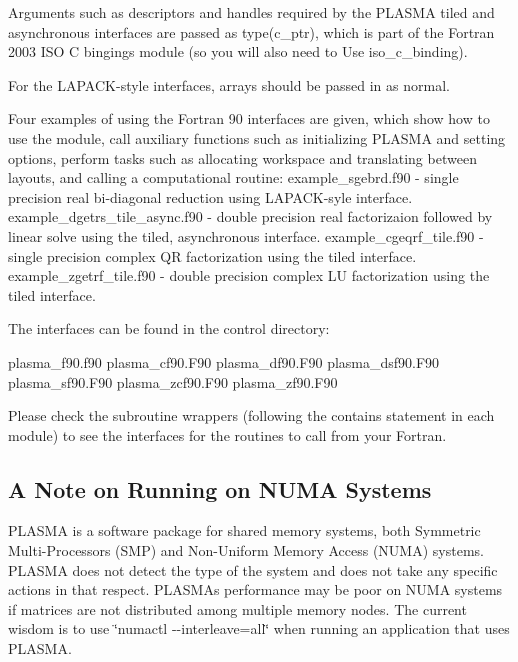 Arguments such as descriptors and handles required by the P\+L\+A\+S\+M\+A tiled and asynchronous interfaces are passed as type(c\+\_\+ptr), which is part of the Fortran 2003 I\+S\+O C bingings module (so you will also need to \textquotesingle{}Use iso\+\_\+c\+\_\+binding\textquotesingle{}).

For the L\+A\+P\+A\+C\+K-\/style interfaces, arrays should be passed in as normal.

Four examples of using the Fortran 90 interfaces are given, which show how to use the module, call auxiliary functions such as initializing P\+L\+A\+S\+M\+A and setting options, perform tasks such as allocating workspace and translating between layouts, and calling a computational routine\+: example\+\_\+sgebrd.\+f90 -\/ single precision real bi-\/diagonal reduction using L\+A\+P\+A\+C\+K-\/syle interface. example\+\_\+dgetrs\+\_\+tile\+\_\+async.\+f90 -\/ double precision real factorizaion followed by linear solve using the tiled, asynchronous interface. example\+\_\+cgeqrf\+\_\+tile.\+f90 -\/ single precision complex Q\+R factorization using the tiled interface. example\+\_\+zgetrf\+\_\+tile.\+f90 -\/ double precision complex L\+U factorization using the tiled interface.

The interfaces can be found in the \textquotesingle{}control\textquotesingle{} directory\+:

plasma\+\_\+f90.\+f90 plasma\+\_\+cf90.\+F90 plasma\+\_\+df90.\+F90 plasma\+\_\+dsf90.\+F90 plasma\+\_\+sf90.\+F90 plasma\+\_\+zcf90.\+F90 plasma\+\_\+zf90.\+F90

Please check the subroutine wrappers (following the \textquotesingle{}contains\textquotesingle{} statement in each module) to see the interfaces for the routines to call from your Fortran.

\subsection*{A Note on Running on N\+U\+M\+A Systems }

P\+L\+A\+S\+M\+A is a software package for shared memory systems, both Symmetric Multi-\/\+Processors (S\+M\+P) and Non-\/\+Uniform Memory Access (N\+U\+M\+A) systems. P\+L\+A\+S\+M\+A does not detect the type of the system and does not take any specific actions in that respect. P\+L\+A\+S\+M\+A\textquotesingle{}s performance may be poor on N\+U\+M\+A systems if matrices are not distributed among multiple memory nodes. The current wisdom is to use \char`\"{}numactl -\/-\/interleave=all\char`\"{} when running an application that uses P\+L\+A\+S\+M\+A.

